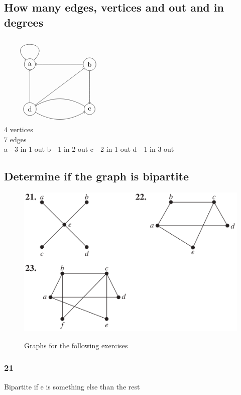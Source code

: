 \documentclass[12pt, a4paper]{report}
\begin{document}
		\subsection{How many edges, vertices and out and in degrees}
			$\begin{tikzpicture}[scale=3]
				\tikzstyle{vertex}=[circle,draw=black]
				\node[vertex](v1) at (0,0.75) {a};
				\node[vertex](v2) at (1,0.75) {b};
				\node[vertex](v3) at (1,0) {c};
				\node[vertex](v4) at (0,0) {d};
				\draw[->] (v4) to [bend right=-0] (v2);
				\draw[->](v2) to [bend right=0] (v1);
				\draw[->] (v4) to [bend right=30] (v3);
				\draw[->] (v3) to [bend right=30] (v4);
				\draw[->] (v4) to (v1);
				\draw[->] (v2) to [bend right=0] (v3);
				\draw[->](v1) to [loop] node {}(v1);
			\end{tikzpicture}$\\
			4 vertices\\
			7 edges\\
			a - 3 in 1 out
			b - 1 in 2 out
			c - 2 in 1 out
			d - 1 in 3 out
		\setcounter{subsection}{20}
		\subsection{Determine if the graph is bipartite}
			\begin{figure}[h!]
				\centering
				\includegraphics[width=\linewidth]{assets/10,3,21-23.png}
				\label{graphs10.3}
				\caption{Graphs for the following exercises}
			\end{figure}
			\subsubsection{21}
				Bipartite if e is something else than the rest
\end{document}
